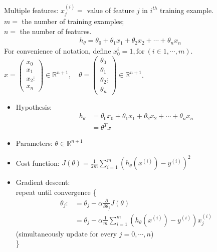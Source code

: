 Multiple features: $x_j^{(i)} = $ value of feature $j$ in $i^{th}$ training example. \\
$m =$ the number of training examples;\\
$n =$ the number of features. \\
\begin{align}
h_\theta = \theta_0 + \theta_1x_1 +  \theta_2x_2 + \cdots + \theta_nx_n
\end{align}
For convenience of notation, define $x^{i}_0 = 1, \text{for} \ (i \in 1, \cdots, m )$. \\
$x = \begin{pmatrix} x_0 \\ x_1 \\ x_2 \vdots \\ x_n \end{pmatrix} \in \mathbb{R}^{n+1}, \quad
\theta = \begin{pmatrix} \theta_0 \\ \theta_1 \\ \theta_2 \vdots \\ \theta_n \end{pmatrix} \in \mathbb{R}^{n+1}$.
\begin{itemize}
\item Hypothesis:
	\begin{align} 
	h_\theta & = \theta_0x_0 + \theta_1x_1 +  \theta_2x_2 + \cdots + \theta_nx_n \nonumber \\
	& = \theta^Tx
	\end{align}
\item Parameters:
$\theta \in \mathbb{R} ^{n+1}$
\item Cost function:
$J(\theta) = \frac{1}{2m}\sum_{i=1}^m(h_\theta(x^{(i)})-y^{(i)})^2$ 
\item Gradient descent:\\
	repeat until convergence \{ \\
	\begin{equation}
	\begin{split}
	\theta_j: &= \theta_j - \alpha \frac{\partial }{\partial \theta_j} J(\theta) \\ 
	    	     &= \theta_j - \alpha \frac{1}{m} \sum_{i=1}^m (h_\theta(x^{(i)}) - y^{(i)}) x_j^{(i)}
	\end{split}
	\end{equation}
	(simultaneously update for every $j=0, \cdots, n$)\\
	\}
\end{itemize}

%
